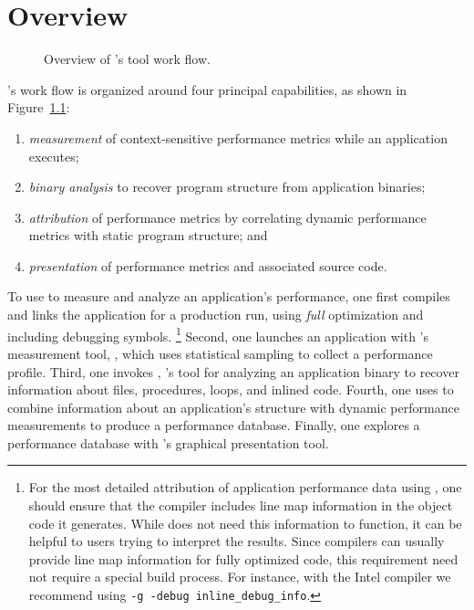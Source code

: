 \documentclass[11pt,letterpaper]{report}
\begin{document}
\chapter{\HPCToolkit{} Overview}


\begin{figure}[t]
\caption{Overview of \HPCToolkit{}'s tool work flow.}

\label{fig:hpctoolkit-overview:a}
\end{figure}

\HPCToolkit{}'s work flow is organized around four principal capabilities, as shown in Figure~\ref{fig:hpctoolkit-overview:a}:
\begin{enumerate}
  \item \emph{measurement} of context-sensitive performance metrics while an application executes;
  \item \emph{binary analysis} to recover program structure from application binaries;
  \item \emph{attribution} of performance metrics by correlating dynamic performance metrics with static program structure; and
  \item \emph{presentation} of performance metrics and associated source code.
\end{enumerate}

To use \HPCToolkit{} to measure and analyze an application's performance, one first compiles and links the application for a production run, using \emph{full} optimization and including debugging symbols.%
\footnote{%
For the most detailed attribution of application performance data using \HPCToolkit{}, one should ensure that the compiler includes line map information in the object code it generates. While \HPCToolkit{} does not need this information to function, it can be helpful to users trying to interpret the results. Since compilers can usually provide line map information for fully optimized code, this requirement need not require a special build process. For instance, with the Intel compiler we recommend using \texttt{-g -debug inline\_debug\_info}.}
Second, one launches an application with \HPCToolkit{}'s measurement tool, \hpcrun{}, which uses statistical sampling to collect a performance profile.
Third, one invokes \hpcstruct{}, \HPCToolkit{}'s tool for analyzing an application binary to recover information about files, procedures, loops, and inlined code.
Fourth, one uses \hpcprof{} to combine information about an application's structure with dynamic performance measurements to produce a performance database.
Finally, one explores a performance database with \HPCToolkit{}'s \hpcviewer{} graphical presentation tool.
\end{document}
